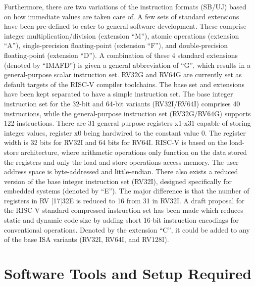 Furthermore, there are two variations of the instruction formats (SB/UJ) based on how immediate values are taken care of. A few sets of standard extensions have been pre-defined to cater to general software development. These comprise integer multiplication/division (extension “M”), atomic operations (extension “A”), single-precision floating-point (extension “F”), and double-precision floating-point (extension “D”). A combination of these 4 standard extensions (denoted by “IMAFD”) is given a general abbreviation of “G”, which results in a general-purpose scalar instruction set. RV32G and RV64G are currently set as default targets of the RISC-V compiler toolchains. The base set and extensions have been kept separated to have a simple instruction set. \newline\newline
The base integer instruction set for the 32-bit and 64-bit variants (RV32I/RV64I) comprises 40 instructions, while the general-purpose instruction set (RV32G/RV64G) supports 122 instructions. There are 31 general purpose registers x1-x31 capable of storing integer values, register x0 being hardwired to the constant value 0. The register width is 32 bits for RV32I and 64 bits for RV64I. RISC-V is based on the load-store architecture, where arithmetic operations only function on the data stored the registers and only the load and store operations access memory. The user address space is byte-addressed and little-endian. \newline\newline
There also exists a reduced version of the base integer instruction set (RV32I), designed specifically for embedded systems (denoted by “E”). The major difference is that the number of registers in RV [17]32E is reduced to 16 from 31 in RV32I. A draft proposal for the RISC-V standard compressed instruction set has been made which reduces static and dynamic code size by adding short 16-bit instruction encodings for conventional operations. Denoted by the extension “C”, it could be added to any of the base ISA variants (RV32I, RV64I, and RV128I). 

 \section{Software Tools and Setup Required}
  \label{sect6_2}

